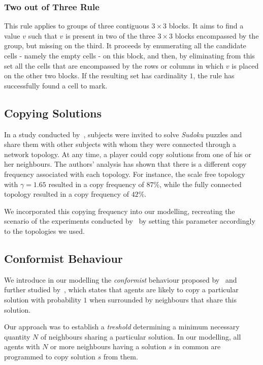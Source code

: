 \documentclass[letterpaper]{article}
\begin{document}
\subsubsection{Two out of Three Rule}

This rule applies to groups of three contiguous $3 \times 3$ blocks. It aims to find a value $v$ such that $v$ is present in two of the three $3 \times 3$ blocks encompassed by the group, but missing on the third. It proceeds by enumerating all the candidate cells - namely the empty cells - on this block, and then, by eliminating from this set all the cells that are encompassed by the rows or columns in which $v$ is placed on the other two blocks. If the resulting set has cardinality $1$, the rule has successfully found a cell to mark.

\subsection{Copying Solutions}

In a study conducted by~\cite{farenzena:collabem}, subjects were invited to solve {\em Sudoku} puzzles and share them with other subjects with whom they were connected through a network topology. At any time, a player could copy solutions from one of his or her neighbours. The authors' analysis has shown that there is a different copy frequency associated with each topology. For instance, the scale free topology with $\gamma = 1.65$ resulted in a copy frequency of $87 \%$, while the fully connected topology resulted in a copy frequency of $42 \%$.

We incorporated this copying frequency into our modelling, recreating the scenario of the experiments conducted by~\cite{farenzena:collabem} by setting this parameter accordingly to the topologies we used.

\subsection{Conformist Behaviour}

We introduce in our modelling the {\em conformist} behaviour proposed by~\cite{cefferson:conformists} and further studied by~\cite{farenzena:collabem}, which states that agents are likely to copy a particular solution with probability $1$ when surrounded by neighbours that share this solution. 

Our approach was to establish a {\em treshold} determining a minimum necessary quantity $N$ of neighbours sharing a particular solution. In our modelling, all agents with $N$ or more neighbours having a solution $s$ in common are programmed to copy solution $s$ from them.
\end{document}
